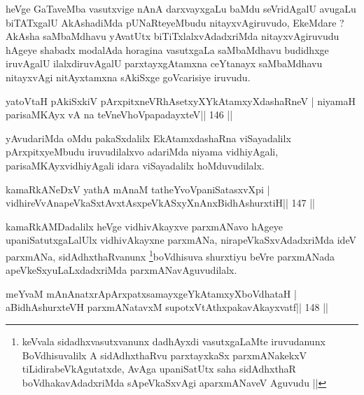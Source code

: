 \begin{artha}
heVge GaTaveMba vasutxvige nAnA darxvayxgaLu baMdu seVridAgalU avugaLu biTATxgalU AkAshadiMda pUNaRteyeMbudu nitayxvAgiruvudo, EkeMdare ? AkAsha saMbaMdhavu yAvatUtx biTiTxlalxvAdadxriMda nitayxvAgiruvudu hAgeye shabadx modalAda horagina vasutxgaLa saMbaMdhavu budidhxge iruvAgalU ilalxdiruvAgalU parxtayxgAtamxna ceYtanayx saMbaMdhavu nitayxvAgi nitAyxtamxna sAkiSxge goVcarisiye iruvudu.
\end{artha}

\begin{shl}
yatoV\s taH pAkiSxkiV pArxpitxneVRhAsetxyXYkAtamxyXdashaRneV |
niyamaH parisaMKAyx vA na teVneVhoVpapadayxteV\hfill || 146 ||
\end{shl}

\begin{artha}
yAvudariMda oMdu pakaSxdalilx EkAtamxdashaRna viSayadalilx pArxpitxyeMbudu iruvudilalxvo adariMda niyama vidhiyAgali, parisaMKAyxvidhiyAgali idara viSayadalilx hoMduvudilalx.
\end{artha}


\begin{shl}
kamaRkANeDxV yathA mAnaM tatheYvoVpaniSatasxvXpi |
vidhireVvAnapeVkaSxtAvxtAsxpeVkASxyXnAnx\footnotemark[3]BidhAshurxtiH\hfill || 147 ||
\end{shl}

\begin{artha}
kamaRkAMDadalilx heVge vidhivAkayxve parxmANavo hAgeye upaniSatutxgaLalUlx vidhivAkayxne parxmANa, nirapeVkaSxvAdadxriMda ideV parxmANa, sidAdhxthaRvanunx \footnote[4]{keVvala sidadhxvasutxvanunx dadhAyxdi vasutxgaLaMte iruvudanunx BoVdhisuvalilx A sidAdhxthaRvu parxtayxkaSx parxmANakekxV tiLidirabeVkAgutatxde, AvAga upaniSatUtx saha sidAdhxthaR boVdhakavAdadxriMda sApeVkaSxvAgi aparxmANaveV Aguvudu ||}boVdhi\-suva shurxtiyu beVre parxmANada apeVkeSxyuLaLxdadxriMda parxmANavAguvudilalx.
\end{artha}


\begin{shl}
meYvaM mAnAnatxrApArxpatxsamayxgeYkAtamxyXboVdhataH |
aBidhAshurxteVH parxmANatavxM supotxVtAthxpakavAkayxvatf\hfill || 148 ||
\end{shl}

